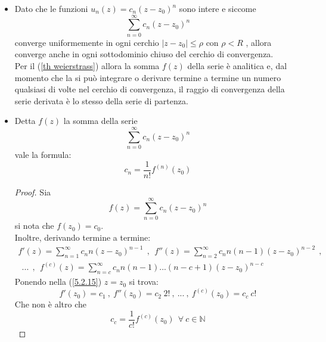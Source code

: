 \documentclass[twoside]{article}
\begin{document}
\begin{itemize}
    
    \item Dato che le funzioni $u_n(z)=c_n(z-z_0)^n$ sono intere e siccome
    \begin{equation}
        \sum_{n=0}^{\infty}c_n(z-z_0)^n
    \end{equation}
    converge uniformemente in ogni cerchio $|z-z_0|\leq \rho$ con $\rho < R$ , allora converge anche in ogni sottodominio chiuso del cerchio di convergenza.
    \\
    Per il (\ref{th weierstrass}) allora la somma $f(z)$ della serie è analitica e, dal momento che la si può integrare o derivare termine a termine un numero qualsiasi di volte nel cerchio di convergenza, il raggio di convergenza della serie derivata è lo stesso della serie di partenza.
    \item Detta $f(z)$ la somma della serie
    \begin{equation}
        \sum_{n=0}^{\infty} c_n(z-z_0)^n
    \end{equation}
    vale la formula:
    \begin{equation}
        c_n=\frac{1}{n!}f^{(n)}(z_0)
    \end{equation}
    \begin{proof}
    Sia 
    \begin{equation}
        f(z)=\sum_{n=0}^{\infty}c_n(z-z_0)^n
    \end{equation}
    si nota che $f(z_0)=c_0$.
    \\
    Inoltre, derivando termine a termine:
    \begin{equation} \label{5.2.15} \begin{split}
        f'(z)=\sum_{n=1}^{\infty}c_n n (z-z_0)^{n-1} \ \ , \ \ f''(z)=\sum_{n=2}^{\infty}c_n n (n-1) (z-z_0)^{n-2} \ \ , \\ \ \ ... \ \ , \ \ f^{(c)}(z)=\sum_{n=c}^{\infty}c_n n(n-1)...(n-c+1)(z-z_0)^{n-c}
   \end{split} \end{equation}
   Ponendo nella (\ref{5.2.15}) $z=z_0$ si trova:
   \begin{equation}
       f'(z_0)=c_1 \ , \ f''(z_0)=c_2 \ 2! \ , \ ... \ , \ f^{(c)}(z_0)=c_c \ c!
   \end{equation}
   Che non è altro che
   \begin{equation}
       c_c=\frac{1}{c!}f^{(c)}(z_0) \ \ \forall \ c \in \mathds{N}
   \end{equation}
    \end{proof}
\end{itemize}
\end{document}
